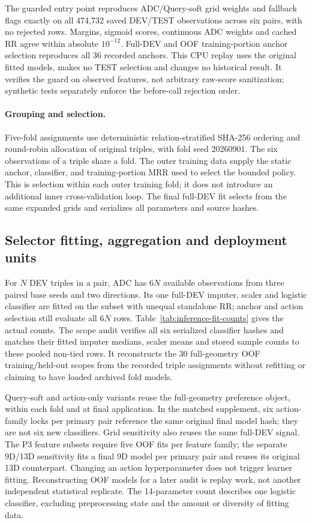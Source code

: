 \documentclass[11pt,a4paper]{article}
\begin{document}
The guarded entry point reproduces ADC/Query-soft grid weights and fallback flags exactly on all 474,732 saved DEV/TEST observations across six pairs, with no rejected rows. Margins, sigmoid scores, continuous ADC weights and cached RR agree within absolute $10^{-12}$. Full-DEV and OOF training-portion anchor selection reproduces all 36 recorded anchors. This CPU replay uses the original fitted models, makes no TEST selection and changes no historical result. It verifies the guard on observed features, not arbitrary raw-score sanitization; synthetic tests separately enforce the before-call rejection order.

\paragraph{Grouping and selection.}
Five-fold assignments use deterministic relation-stratified SHA-256 ordering and round-robin allocation of original triples, with fold seed 20260901. The six observations of a triple share a fold. The outer training data supply the static anchor, classifier, and training-portion MRR used to select the bounded policy. This is selection within each outer training fold; it does not introduce an additional inner cross-validation loop. The final full-DEV fit selects from the same expanded grids and serializes all parameters and source hashes.

\subsection{Selector fitting, aggregation and deployment units}
\label{app:training-scope}
For $N$ DEV triples in a pair, ADC has $6N$ available observations from three paired base seeds and two directions. Its one full-DEV imputer, scaler and logistic classifier are fitted on the subset with unequal standalone RR; anchor and action selection still evaluate all $6N$ rows. Table~\ref{tab:inference-fit-counts} gives the actual counts. The scope audit verifies all six serialized classifier hashes and matches their fitted imputer medians, scaler means and stored sample counts to these pooled non-tied rows. It reconstructs the 30 full-geometry OOF training/held-out scopes from the recorded triple assignments without refitting or claiming to have loaded archived fold models.




Query-soft and action-only variants reuse the full-geometry preference object, within each fold and at final application. In the matched supplement, six action-family locks per primary pair reference the same original final model hash; they are not six new classifiers. Grid sensitivity also reuses the same full-DEV signal. The P3 feature subsets require five OOF fits per feature family; the separate 9D/13D sensitivity fits a final 9D model per primary pair and reuses its original 13D counterpart. Changing an action hyperparameter does not trigger learner fitting. Reconstructing OOF models for a later audit is replay work, not another independent statistical replicate. The 14-parameter count describes one logistic classifier, excluding preprocessing state and the amount or diversity of fitting data.
\end{document}

